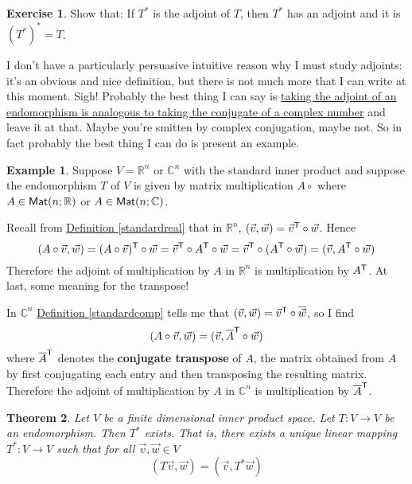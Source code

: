 \documentclass[11pt]{amsbook}
\newtheorem{theorem}{Theorem}[section]
\theoremstyle{definition}
\newtheorem{ex}[theorem]{Example}
\newtheorem{exercise}{Exercise}
\begin{document}
\begin{exercise}
Show that: If $T^{\ast}$ is the adjoint of $T$, then $T^{\ast}$ has an adjoint and it is $(T^{\ast})^{\ast} = T$.
\end{exercise}

I don't have a particularly persuasive intuitive reason why I must study adjoints: it's an obvious and nice definition, but there is not much more that I can write at this moment. Sigh! Probably the best thing I can say is \href{http://golem.ph.utexas.edu/category/2013/08/linear_operators_done_right.html}{taking the adjoint of an endomorphism is analogous to taking the conjugate of a complex number} and leave it at that. Maybe you're smitten by complex conjugation, maybe not. So in fact probably the best thing I can do is present an example.

\begin{ex} \label{adjtrn} Suppose $V = \mathbb{R}^n$ or $\mathbb{C}^n$ with the standard inner product and suppose the endomorphism $T$ of $V$ is given by matrix multiplication $A\circ$ where $A\in {\sf Mat}(n;\mathbb{R})$ or $A\in {\sf Mat}(n; \mathbb{C})$.

Recall from \hyperref[standardreal]{Definition \ref{standardreal}} that in $\mathbb{R}^n$, $(\vec{v}, \vec{w}) = \vec{v}^{\sf T} \circ \vec{w}$. Hence $$(A\circ \vec{v},  \vec{w}) = (A\circ\vec{v})^{\sf T}\circ \vec{w} = \vec{v}^{\sf T} \circ A^{\sf T} \circ \vec{w} = \vec{v}^{\sf T} \circ (A^{\sf T}\circ \vec{w} )= (\vec{v}, A^{\sf T}\circ\vec{w})$$ Therefore the adjoint of multiplication by $A$ in $\mathbb{R}^n$ is multiplication by $A^{\sf T}$. At last, some meaning for the transpose!

In $\mathbb{C}^n$ \hyperref[standardcomp]{Definition \ref{standardcomp}} tells me that $(\vec{v}, \vec{w}) = \vec{v}^{\sf T} \circ \overline{\vec{w}}$, so I find $$(A\circ\vec{v}, \vec{w}) = ( \vec{v}, \overline{A}^{\sf T}\circ\vec{w})$$ where $\overline{A}^{\sf T}$ denotes the {\bf conjugate transpose} of $A$, the matrix obtained from $A$ by first conjugating each entry and then transposing the resulting matrix. Therefore the adjoint of multiplication by $A$ in $\mathbb{C}^n$ is multiplication by $\overline{A}^{\sf T}$.
\end{ex}

\begin{theorem} \label{adjoint} Let $V$  be a finite dimensional inner product space. Let $T:V\to V$ be an endomorphism. Then $T^\ast$ exists. That is, there exists a unique linear mapping $T^\ast : V\to V$ such that for all $\vec{v}, \vec{w}\in V$ $$( T\vec{v}, \vec{w}) = (\vec{v}, T^{\ast}\vec{w})$$
\end{theorem}
\end{document}
